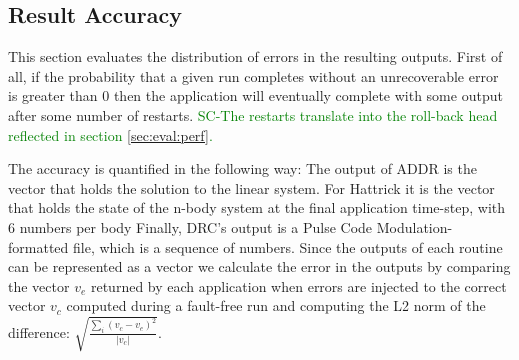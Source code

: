 \documentclass[10pt, conference, compsocconf]{IEEEtran}
\newcommand{\sui}[1]{%
  \textcolor{green}{SC-#1}
}
\begin{document}



\subsection{Result Accuracy}
\label{sec:eval:acc}


This section evaluates the distribution of errors in the resulting outputs.
First of all, if the probability that a given run completes without an unrecoverable error is greater than 0 then the application will eventually complete with some output after some number of restarts. \sui{The restarts translate into the roll-back head reflected in section \ref{sec:eval:perf}.}

The accuracy is quantified in the following way:
The output of ADDR is the vector that holds the solution to the linear system.
For Hattrick it is the vector that holds the state of the n-body system at the final application time-step, with 6 numbers per body
Finally, DRC's output is a Pulse Code Modulation-formatted file, which is a sequence of numbers.
Since the outputs of each routine can be represented as a vector we calculate the error in the outputs by comparing the vector $v_e$ returned by each application when errors are injected to the correct vector $v_c$ computed during a fault-free run and computing the L2 norm of the difference: $\sqrt{\frac{\sum_{i} (v_c-v_e)^2}{\left| v_c \right|}}$.
\end{document}
